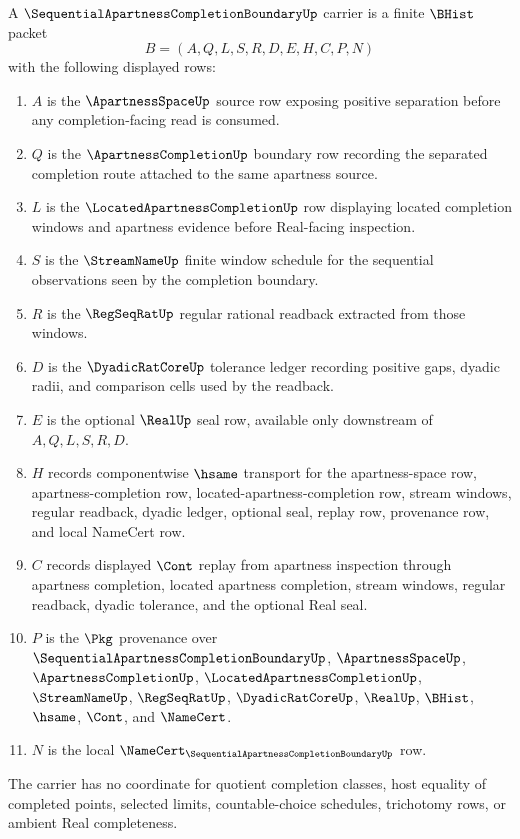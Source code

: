 \begin{definition}
\label{def:sequential-apartness-completion-boundary-carrier}
A $\SequentialApartnessCompletionBoundaryUp$ carrier is a finite $\BHist$ packet
$$
B=(A,Q,L,S,R,D,E,H,C,P,N)
$$
with the following displayed rows:
\begin{enumerate}
\item $A$ is the $\ApartnessSpaceUp$ source row exposing positive separation before any completion-facing read is consumed.
\item $Q$ is the $\ApartnessCompletionUp$ boundary row recording the separated completion route attached to the same apartness source.
\item $L$ is the $\LocatedApartnessCompletionUp$ row displaying located completion windows and apartness evidence before Real-facing inspection.
\item $S$ is the $\StreamNameUp$ finite window schedule for the sequential observations seen by the completion boundary.
\item $R$ is the $\RegSeqRatUp$ regular rational readback extracted from those windows.
\item $D$ is the $\DyadicRatCoreUp$ tolerance ledger recording positive gaps, dyadic radii, and comparison cells used by the readback.
\item $E$ is the optional $\RealUp$ seal row, available only downstream of $A,Q,L,S,R,D$.
\item $H$ records componentwise $\hsame$ transport for the apartness-space row, apartness-completion row, located-apartness-completion row, stream windows, regular readback, dyadic ledger, optional seal, replay row, provenance row, and local NameCert row.
\item $C$ records displayed $\Cont$ replay from apartness inspection through apartness completion, located apartness completion, stream windows, regular readback, dyadic tolerance, and the optional Real seal.
\item $P$ is the $\Pkg$ provenance over $\SequentialApartnessCompletionBoundaryUp$, $\ApartnessSpaceUp$, $\ApartnessCompletionUp$, $\LocatedApartnessCompletionUp$, $\StreamNameUp$, $\RegSeqRatUp$, $\DyadicRatCoreUp$, $\RealUp$, $\BHist$, $\hsame$, $\Cont$, and $\NameCert$.
\item $N$ is the local $\NameCert_{\SequentialApartnessCompletionBoundaryUp}$ row.
\end{enumerate}
The carrier has no coordinate for quotient completion classes, host equality of completed points, selected limits, countable-choice schedules, trichotomy rows, or ambient Real completeness.
\end{definition}

